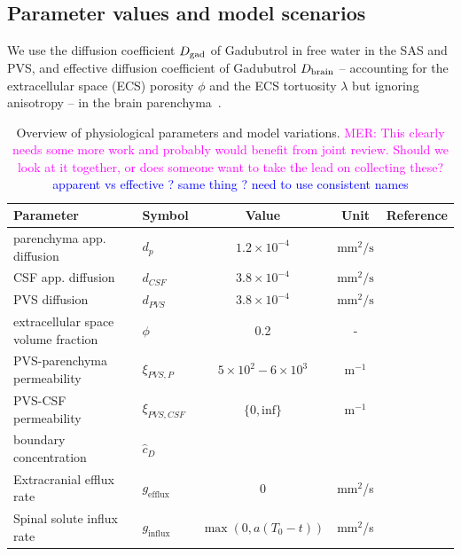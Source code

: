 \documentclass[fleqn,10pt]{wlscirep}
\newcommand{\rami}[1]{\textcolor{blue}{#1}}
\newcommand{\mer}[1]{\textcolor{magenta}{#1}}
\begin{document}
\subsection*{Parameter values and model scenarios}
We use the diffusion coefficient $D_{\rm gad}$ of Gadubutrol in free water in the SAS and PVS, and effective diffusion coefficient of Gadubutrol $D_{\rm brain}$ -- accounting for the extracellular space (ECS) porosity $\phi$ and the ECS tortuosity $\lambda$ but ignoring anisotropy  -- in the brain parenchyma~\cite{hornkjol2022csf}. 
\begin{table}
  \begin{center}
    \begin{tabular}{ll|ccc}
      \toprule
      Parameter& Symbol & Value & Unit& Reference\\
      \midrule
         parenchyma app. diffusion&  $d_p$&  $1.2 \times 10^{-4}$& $\text{mm}^2/\text{s}$  & \cite{valnes2020apparent}\\
         CSF app. diffusion&  $d_{CSF}$&  $3.8 \times 10^{-4}$& $\text{mm}^2/\text{s}$ & \cite{valnes2020apparent}\\
         PVS diffusion&  $d_{PVS}$&  $3.8 \times 10^{-4}$& $\text{mm}^2/\text{s}$ & \cite{valnes2020apparent}\\
         extracellular space volume fraction& $\phi$& 0.2& - &\cite{nicholson1981ion} \\
         PVS-parenchyma permeability&  $\xi_{PVS,P}$& $5 \times 10^{2} - 6 \times 10^{3} $  & $\text{m}^{-1}$ & \cite{koch2023estimates} \\
         PVS-CSF permeability&  $\xi_{PVS,CSF}$& $\{0, \text{inf}\}$ & $\text{m}^{-1}$ & \\ 
         boundary concentration& $\hat{c}_D$& & &\\ \hline
         Extracranial efflux rate & $g_{\mathrm{efflux}}$  & 0 & mm$^2$/s \\
         Spinal solute influx rate & $g_{\mathrm{influx}}$ & $\max(0, a(T_0 - t))$  & mm$^2$/s
    \end{tabular}
  \end{center}
  \caption{Overview of physiological parameters and model variations. \mer{MER: This clearly needs some more work and probably would benefit from joint review. Should we look at it together, or does someone want to take the lead on collecting these?} \rami{apparent vs effective ? same thing ? need to use consistent names}}
  \label{tab:overview}
\end{table}
\end{document}

